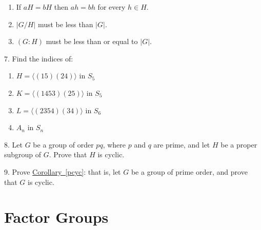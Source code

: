 \documentclass[10pt,openany,oneside]{book}
\theoremstyle{plain}
\theoremstyle{definition}
\theoremstyle{definition}
\theoremstyle{definition}
\theoremstyle{definition}
\numberwithin{equation}{section}
\begin{document}
\begin{exerciselist}
\begin{enumerate}[label=(\alph*)]
\item\hypertarget{li-466}{}If \(aH=bH\) then \(ah=bh\) for every \(h\in H\).%
\item\hypertarget{li-467}{}\(|G/H|\) must be less than \(|G|\).%
\item\hypertarget{li-468}{}\((G:H)\) must be less than or equal to \(|G|\).%
\end{enumerate}
%
\par\smallskip
\item[7.]\hypertarget{exercise-56}{}Find the indices of: \leavevmode%
\begin{enumerate}[label=(\alph*)]
\item\hypertarget{li-477}{}\(H=\langle (15)(24)\rangle\) in \(S_5\)%
\item\hypertarget{li-478}{}\(K=\langle (1453)(25)\rangle\) in \(S_5\)%
\item\hypertarget{li-479}{}\(L=\langle (2354)(34)\rangle\) in \(S_6\)%
\item\hypertarget{li-480}{}\(A_n\) in \(S_n\)%
\end{enumerate}
%
\par\smallskip
\item[8.]\hypertarget{exercise-57}{}Let \(G\) be a group of order \(pq\), where \(p\) and \(q\) are prime, and let \(H\) be a proper subgroup of \(G\). Prove that \(H\) is cyclic.%
\par\smallskip
\item[9.]\hypertarget{exercise-58}{}Prove \hyperref[pcyc]{Corollary~\ref{pcyc}}: that is, let \(G\) be a group of prime order, and prove that \(G\) is cyclic.%
\par\smallskip
\end{exerciselist}
\typeout{************************************************}
\typeout{************************************************}
\chapter[{Factor Groups}]{Factor Groups}\label{factorgps}
\typeout{************************************************}
\typeout{************************************************}
\end{document}
